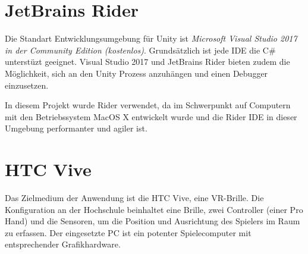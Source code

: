 \section{JetBrains Rider}
\label{Rider}
Die Standart Entwicklungsumgebung für Unity ist \emph{Microsoft Visual Studio 2017 in der Community Edition (kostenlos)}. Grundsätzlich ist jede IDE die C\# unterstüzt geeignet. Visual Studio 2017 und JetBrains Rider bieten zudem die Möglichkeit, sich an den Unity Prozess anzuhängen und einen Debugger einzusetzen. 

In diesem Projekt wurde Rider verwendet, da im Schwerpunkt auf Computern mit den Betriebssystem MacOS X entwickelt wurde und die Rider IDE in dieser Umgebung performanter und agiler ist.


\section{HTC Vive}
\label{Vive}
Das Zielmedium der Anwendung ist die HTC Vive, eine VR-Brille. Die Konfiguration an der Hochschule beinhaltet eine Brille, zwei Controller (einer Pro Hand) und die Sensoren, um die Position und Ausrichtung des Spielers im Raum zu erfassen. 
Der eingesetzte PC ist ein potenter Spielecomputer mit entsprechender Grafikhardware.

 